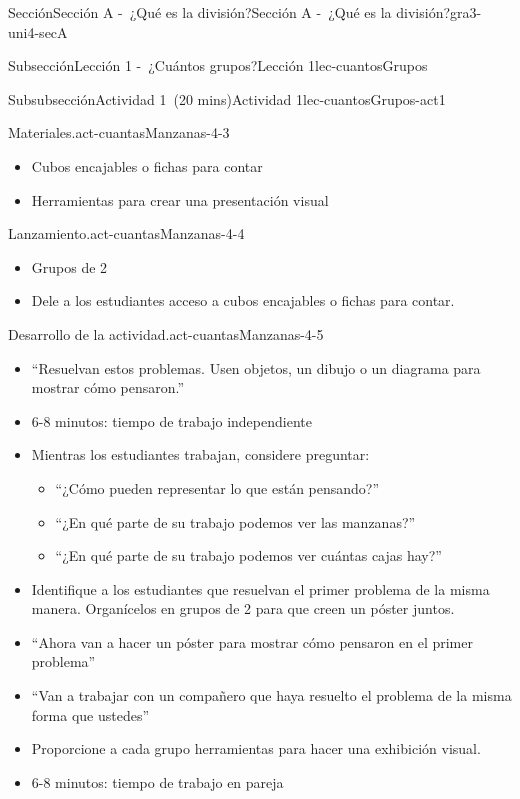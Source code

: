 \documentclass[oneside,10pt,]{article}
\begin{document}
\begin{sectionptx}{Sección}{Sección A -~¿Qué es la división?}{}{Sección A -~¿Qué es la división?}{}{}{gra3-uni4-secA}
\begin{subsectionptx}{Subsección}{Lección 1 -~¿Cuántos grupos?}{}{Lección 1}{}{}{lec-cuantosGrupos}
\begin{subsubsectionptx}{Subsubsección}{Actividad 1~(20 mins)}{}{Actividad 1}{}{}{lec-cuantosGrupos-act1}
\begin{paragraphs}{Materiales.}{act-cuantasManzanas-4-3}
%
\begin{itemize}[label=\textbullet]
\item{}Cubos encajables o fichas para contar%
\item{}Herramientas para crear una presentación visual%
\end{itemize}
\end{paragraphs}%
\begin{paragraphs}{Lanzamiento.}{act-cuantasManzanas-4-4}%
%
\begin{itemize}[label=\textbullet]
\item{}Grupos de 2%
\item{}Dele a los estudiantes acceso a cubos encajables o fichas para contar.%
\end{itemize}
\end{paragraphs}%
\begin{paragraphs}{Desarrollo de la actividad.}{act-cuantasManzanas-4-5}%
%
\begin{itemize}[label=\textbullet]
\item{}``Resuelvan estos problemas. Usen objetos, un dibujo o un diagrama para mostrar cómo pensaron.''%
\item{}6-8 minutos: tiempo de trabajo independiente%
\item{}Mientras los estudiantes trabajan, considere preguntar:%
\begin{itemize}[label=$\circ$]
\item{}``¿Cómo pueden representar lo que están pensando?''%
\item{}``¿En qué parte de su trabajo podemos ver las manzanas?''%
\item{}``¿En qué parte de su trabajo podemos ver cuántas cajas hay?''%
\end{itemize}
%
\item{}Identifique a los estudiantes que resuelvan el primer problema de la misma manera. Organícelos en grupos de 2 para que creen un póster juntos.%
\item{}``Ahora van a hacer un póster para mostrar cómo pensaron en el primer problema''%
\item{}``Van a trabajar con un compañero que haya resuelto el problema de la misma forma que ustedes''%
\item{}Proporcione a cada grupo herramientas para hacer una exhibición visual.%
\item{}6-8 minutos: tiempo de trabajo en pareja%
\end{itemize}
\end{paragraphs}%

\end{subsubsectionptx}
\end{subsectionptx}
\end{sectionptx}
\end{document}
